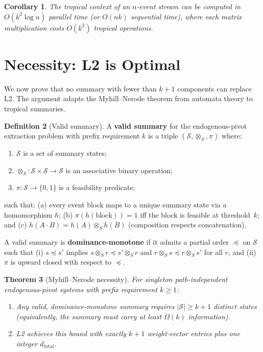\documentclass[11pt]{article}
\theoremstyle{plain}
\newtheorem{theorem}{Theorem}[section]
\newtheorem{corollary}[theorem]{Corollary}
\theoremstyle{definition}
\newtheorem{definition}[theorem]{Definition}
\theoremstyle{remark}
\newcommand{\dtotal}{{d_{\mathrm{total}}}}
\begin{document}
\begin{corollary}\label{cor:parallel}
The tropical context of an $n$-event stream can be computed in
$O(k^2 \log n)$ parallel time (or $O(nk)$ sequential time), where each
matrix multiplication costs $O(k^2)$ tropical operations.
\end{corollary}

\section{Necessity: L2 is Optimal}\label{sec:necessity}

We now prove that no summary with fewer than $k+1$ components can
replace L2.  The argument adapts the Myhill--Nerode theorem
\cite{hopcroft1979introduction} from automata theory to tropical
summaries.

\begin{definition}[Valid summary]\label{def:valid-summary}
A \textbf{valid summary} for the endogenous-pivot extraction problem
with prefix requirement $k$ is a triple $(\mathcal{S}, \otimes_S,
\pi)$ where:
\begin{enumerate}[label=(\roman*),nosep]
  \item $\mathcal{S}$ is a set of summary states;
  \item $\otimes_S \colon \mathcal{S} \times \mathcal{S} \to
    \mathcal{S}$ is an associative binary operation;
  \item $\pi \colon \mathcal{S} \to \{0,1\}$ is a feasibility
    predicate;
\end{enumerate}
such that: (a) every event block maps to a unique summary state via a
homomorphism $h$; (b) $\pi(h(\text{block})) = 1$ iff the block is
feasible at threshold~$k$; and (c) $h(A \cdot B) = h(A) \otimes_S
h(B)$ (composition respects concatenation).

A valid summary is \textbf{dominance-monotone} if it admits a partial
order $\preceq$ on $\mathcal{S}$ such that (i) $s \preceq s'$ implies
$s \otimes_S r \preceq s' \otimes_S r$ and $r \otimes_S s \preceq r
\otimes_S s'$ for all $r$, and (ii) $\pi$ is upward closed with
respect to $\preceq$.
\end{definition}

\begin{theorem}[Myhill--Nerode necessity]\label{thm:myhill-nerode}
For singleton path-independent endogenous-pivot systems with prefix
requirement $k \ge 1$:
\begin{enumerate}[label=(\alph*)]
  \item Any valid, dominance-monotone summary requires
    $|\mathcal{S}| \ge k + 1$ distinct states (equivalently, the
    summary must carry at least $\Omega(k)$ information).
  \item L2 achieves this bound with exactly $k+1$ weight-vector
    entries plus one integer $\dtotal$.
\end{enumerate}
\end{theorem}
\end{document}
